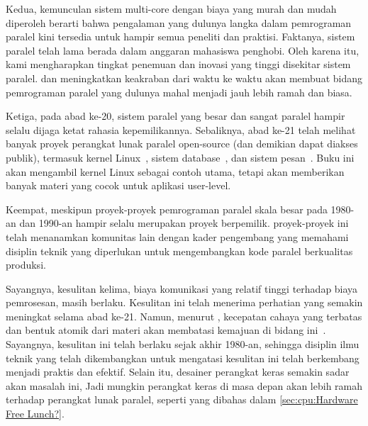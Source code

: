 Kedua, kemunculan sistem multi-core dengan biaya yang murah dan mudah diperoleh
berarti bahwa pengalaman yang dulunya langka dalam pemrograman paralel kini
tersedia untuk hampir semua peneliti dan praktisi. Faktanya, sistem paralel
telah lama berada dalam anggaran mahasiswa penghobi. Oleh karena itu, kami
mengharapkan tingkat penemuan dan inovasi yang tinggi disekitar sistem paralel.
dan meningkatkan keakraban dari waktu ke waktu akan membuat bidang pemrograman
paralel yang dulunya mahal menjadi jauh lebih ramah dan biasa.

Ketiga, pada abad ke-20, sistem paralel yang besar dan sangat paralel hampir
selalu dijaga ketat rahasia kepemilikannya. Sebaliknya, abad ke-21 telah melihat
banyak proyek perangkat lunak paralel open-source (dan demikian dapat diakses
publik), termasuk kernel Linux~\cite{Torvalds2.6kernel}, sistem
database~\cite{PostgreSQL2008,MySQL2008}, dan sistem
pesan~\cite{OpenMPI2008,BOINC2008}. Buku ini akan mengambil kernel Linux sebagai
contoh utama, tetapi akan memberikan banyak materi yang cocok untuk aplikasi
user-level.

Keempat, meskipun proyek-proyek pemrograman paralel skala besar pada 1980-an dan
1990-an hampir selalu merupakan proyek berpemilik. proyek-proyek ini telah
menanamkan komunitas lain dengan kader pengembang yang memahami disiplin teknik
yang diperlukan untuk mengembangkan kode paralel berkualitas produksi.

Sayangnya, kesulitan kelima, biaya komunikasi yang relatif tinggi terhadap biaya
pemrosesan, masih berlaku. Kesulitan ini telah menerima perhatian yang semakin
meningkat selama abad ke-21. Namun, menurut , kecepatan
cahaya yang terbatas dan bentuk atomik dari materi akan membatasi kemajuan di
bidang ini~\cite{BryanGardiner2007,GordonMoore03a}. Sayangnya, kesulitan ini
telah berlaku sejak akhir 1980-an, sehingga disiplin ilmu teknik yang telah
dikembangkan untuk mengatasi kesulitan ini telah berkembang menjadi praktis dan
efektif. Selain itu, desainer perangkat keras semakin sadar akan masalah ini,
Jadi mungkin perangkat keras di masa depan akan lebih ramah terhadap perangkat
lunak paralel, seperti yang dibahas dalam \cref{sec:cpu:Hardware Free Lunch?}.

